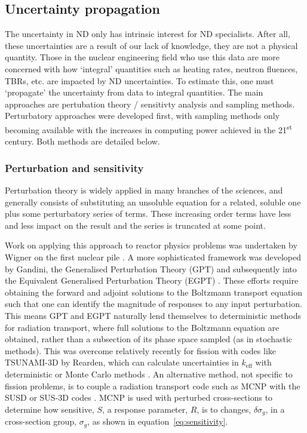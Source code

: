 
\subsection{Uncertainty propagation}
The uncertainty in ND only has intrinsic interest for ND specialists. After all, these uncertainties are a result of our lack of knowledge, they are not a physical quantity. Those in the nuclear engineering field who use this data are more concerned with how `integral' quantities such as heating rates, neutron fluences, TBRs, etc. are impacted by ND uncertainties. To estimate this, one must `propagate' the uncertainty from data to integral quantities. The main approaches are pertubation theory / sensitivty analysis and sampling methods. Perturbatory approaches were developed first, with sampling methods only becoming available with the increases in computing power achieved in the 21\textsuperscript{st} century. Both methods are detailed below.
\subsubsection{Perturbation and sensitivity}
Perturbation theory is widely applied in many branches of the sciences, and generally consists of substituting an unsoluble equation for a related, soluble one plus some perturbatory series of terms. These increasing order terms have less and less impact on the result and the series is truncated at some point. 

Work on applying this approach to reactor physics problems was undertaken by Wigner on the first nuclear pile \cite{Rising2012}. A more sophisticated framework was developed by Gandini, the Generalised Perturbation Theory (GPT) \cite{Gandini1967} and subsequently into the Equivalent Generalised Perturbation Theory (EGPT) \cite{Gandini1986}. These efforts require obtaining the forward and adjoint solutions to the Boltzmann transport equation such that one can identify the magnitude of responses to any input perturbation. This means GPT and EGPT naturally lend themselves to deterministic methods for radiation transport, where full solutions to the Boltzmann equation are obtained, rather than a subsection of its phase space sampled (as in stochastic methods). This was overcome relatively recently for fission with codes like TSUNAMI-3D by Rearden, which can calculate uncertainties in $k_{\mathrm{eff}}$ with deterministic or Monte Carlo methods \cite{Rearden2004}. An alternative method, not specific to fission problems, is to couple a radiation transport code such as MCNP \cite{} with the SUSD or SUS-3D codes \cite{}. MCNP is used with perturbed cross-sections to determine how sensitive, $S$, a response parameter, $R$, is to changes, $\delta \sigma_{g}$, in a cross-section group, $\sigma_{g}$, as shown in equation~\ref{eq:sensitivity}.

